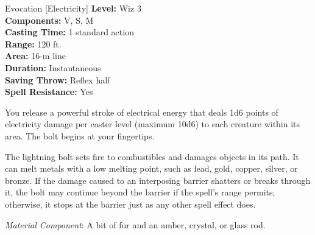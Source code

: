 {Evocation [Electricity]}
{
	\textbf{Level:}
	Wiz 3\\
	\textbf{Components:}
	V, S, M\\
	\textbf{Casting Time:}
	1 standard action\\
	\textbf{Range:}
	120 ft.\\
	\textbf{Area:}
	16-m line\\
	\textbf{Duration:}
	Instantaneous\\
	\textbf{Saving Throw:}
	Reflex half\\
	\textbf{Spell Resistance:}
	Yes\\
}
{
	You release a powerful stroke of electrical energy that deals 1d6 points of electricity damage per caster level (maximum 10d6) to each creature within its area. The bolt begins at your fingertips.

	The lightning bolt sets fire to combustibles and damages objects in its path. It can melt metals with a low melting point, such as lead, gold, copper, silver, or bronze. If the damage caused to an interposing barrier shatters or breaks through it, the bolt may continue beyond the barrier if the spell's range permits; otherwise, it stops at the barrier just as any other spell effect does.

	\textit{Material Component}:
	A bit of fur and an amber, crystal, or glass rod.

}
